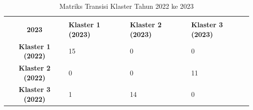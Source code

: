 \begin{table}[H]
\centering
\caption{Matriks Transisi Klaster Tahun 2022 ke 2023} \label{tab:transisi_2022_2023}
\begin{tabular}{|c|p{2cm}|p{2cm}|p{2cm}|}
\hline
\makecell{\textbf{Tahun 2022} \\ \textbf{2023}} & \textbf{Klaster 1 (2023)} & \textbf{Klaster 2 (2023)} & \textbf{Klaster 3 (2023)} \\ \hline
\textbf{Klaster 1 (2022)} & 15 & 0 & 0 \\ \hline
\textbf{Klaster 2 (2022)} & 0 & 0 & 11 \\ \hline
\textbf{Klaster 3 (2022)} & 1 & 14 & 0 \\ \hline
\end{tabular}
\end{table}